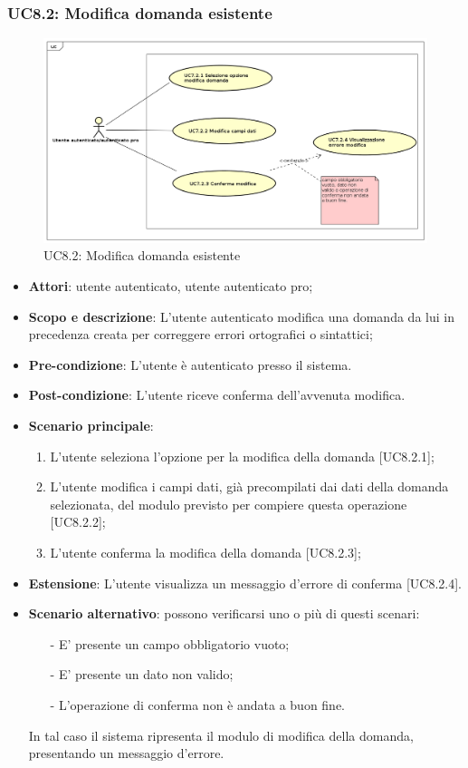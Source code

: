 	\subsubsection{UC8.2: Modifica domanda esistente}
	\label{UC8.2}
	\begin{figure}[h]
		\centering
			\includegraphics[scale=0.45,keepaspectratio]{UML/UC8_2.png}
		\caption{UC8.2: Modifica domanda esistente}
	\end{figure}
	\FloatBarrier
	\begin{itemize}
		\item
			\textbf{Attori}: utente autenticato, utente autenticato pro;
		\item		
			\textbf{Scopo e descrizione}: L'utente autenticato modifica una domanda da lui in precedenza creata per correggere errori ortografici o sintattici;
		\item
			\textbf{Pre-condizione}: L'utente è autenticato presso il sistema. 
		\item
			\textbf{	Post-condizione}: L'utente riceve conferma dell'avvenuta modifica.
		\item
			\textbf{Scenario principale}:
	       		\begin{enumerate}
					\item 	
					L'utente seleziona l'opzione per la modifica della domanda [UC8.2.1];
					\item
					L'utente modifica i campi dati, già precompilati dai dati della domanda selezionata, del modulo previsto per compiere questa operazione [UC8.2.2];
					\item
					L'utente conferma la modifica della domanda [UC8.2.3];
	 			\end{enumerate}
	 	\item
			\textbf{Estensione}: L'utente visualizza un messaggio d'errore di conferma [UC8.2.4].
	 	\item
	 		\textbf{Scenario alternativo}: possono verificarsi uno o più di questi scenari:
				\begin{itemize}
					\item[-] 	
						E' presente un campo obbligatorio vuoto;
					\item[-] 
    						E' presente  un dato non valido;
					\item[-] 
						L'operazione di conferma non è andata a buon fine.
				\end{itemize}
			In tal caso il sistema ripresenta il modulo di modifica della domanda, presentando un messaggio d'errore.
	\end{itemize}
